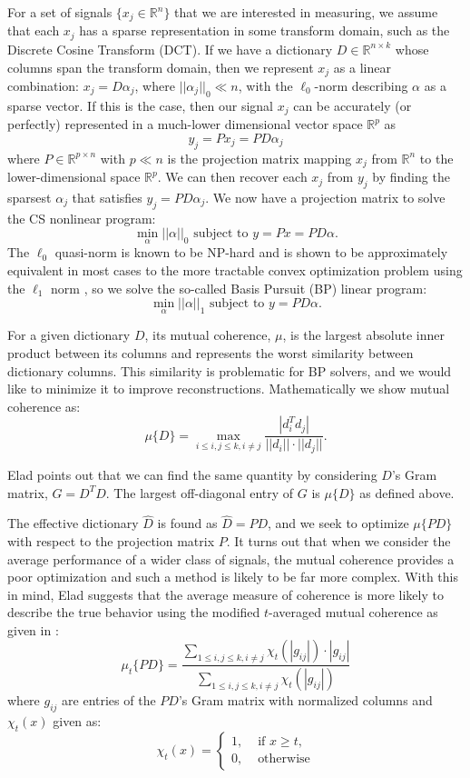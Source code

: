 \documentclass[journal]{IEEEtran}
\begin{document}
For a set of signals $\{x_j \in \mathbb{R}^n\}$ that we are interested in measuring, we assume that each $x_j$ has a sparse representation in some transform domain, such as the Discrete Cosine Transform (DCT).  If we have a dictionary $D \in \mathbb{R}^{n\times k}$ whose columns span the transform domain, then we represent $x_j$ as a linear combination: $x_j = D\alpha_j$, where $||\alpha_j||_0 \ll n$, with the $\ell_0$-norm describing $\alpha$ as a sparse vector.  If this is the case, then our signal $x_j$ can be accurately (or perfectly) represented in a much-lower dimensional vector space $\mathbb{R}^p$ as $$y_j = Px_j=PD\alpha_j$$ where $P \in \mathbb{R}^{p\times n}$ with $p \ll n$ is the projection matrix mapping $x_j$ from $\mathbb{R}^n$ to the lower-dimensional space $\mathbb{R}^p$.  We can then recover each $x_j$ from $y_j$ by finding the sparsest $\alpha_j$ that satisfies $y_j = PD\alpha_j$.  We now have a projection matrix to solve the CS nonlinear program: $$ \min_\alpha ||\alpha||_0 \mbox{ subject to } y = Px = PD\alpha.$$  The $\ell_0$ quasi-norm is known to be NP-hard and is shown to be approximately equivalent in most cases to the more tractable convex optimization problem using the $\ell_1$ norm \cite{convexoptimization}, so we solve the so-called Basis Pursuit (BP) linear program: $$ \min_\alpha ||\alpha||_1 \mbox{ subject to } y = PD\alpha .$$

For a given dictionary $D$, its mutual coherence, $\mu$, is the largest absolute inner product between its columns and represents the worst similarity between dictionary columns.  This similarity is problematic for BP solvers, and we would like to minimize it to improve reconstructions.  Mathematically we show mutual coherence as: $$ \mu\{D\} = \max_{i \leq i,j \leq k, i \neq j} \frac{| d_i^Td_j |}{|| d_i || \cdot || d_j ||}. $$

Elad points out that we can find the same quantity by considering $D$'s Gram matrix, $G = D^TD$.  The largest off-diagonal entry of $G$ is $\mu\{D\}$ as defined above.

The effective dictionary $\hat{D}$ is found as $ \hat{D} = PD$, and we seek to optimize $\mu\{PD\}$ with respect to the projection matrix $P$.  It turns out that when we consider the average performance of a wider class of signals, the mutual coherence provides a poor optimization and such a method is likely to be far more complex.  With this in mind, Elad suggests that the average measure of coherence is more likely to describe the true behavior using the modified $t$-averaged mutual coherence as given in \cite{lin}: $$ \mu_t\{PD\} = \frac{ \sum_{1 \leq i,j \leq k, i \neq j} \chi_t(| g_{ij}|) \cdot | g_{ij} | }{ \sum_{1 \leq i,j \leq k, i \neq j} \chi_t(|g_{ij}|)} $$ where $g_{ij}$ are entries of the $PD$'s Gram matrix with normalized columns and $\chi_t(x)$ given as: $$ \chi_t(x) = \begin{cases}  1, & \mbox{ if } x \geq t, \\  0, & \mbox{ otherwise} \end{cases}$$
\end{document}
